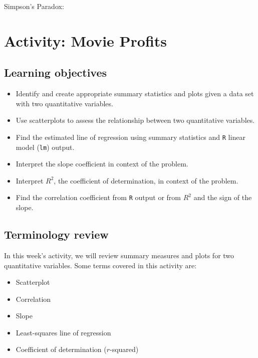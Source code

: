 \documentclass[
]{report}
\begin{document}
Simpson's Paradox:

\newpage

\hypertarget{activity-movie-profits}{%
\section{Activity: Movie Profits}\label{activity-movie-profits}}


\hypertarget{learning-objectives-1}{%
\subsection{Learning objectives}\label{learning-objectives-1}}

\begin{itemize}
\item
  Identify and create appropriate summary statistics and plots
  given a data set with two quantitative variables.
\item
  Use scatterplots to assess the relationship between two quantitative variables.
\item
  Find the estimated line of regression using summary statistics and \texttt{R} linear model (\texttt{lm}) output.
\item
  Interpret the slope coefficient in context of the problem.
\item
  Interpret \(R^2\), the coefficient of determination, in context of the problem.
\item
  Find the correlation coefficient from \texttt{R} output or from \(R^2\) and the sign of the slope.
\end{itemize}

\hypertarget{terminology-review-4}{%
\subsection{Terminology review}\label{terminology-review-4}}

In this week's activity, we will review summary measures and plots for two quantitative variables. Some terms covered in this activity are:

\begin{itemize}
\item
  Scatterplot
\item
  Correlation
\item
  Slope
\item
  Least-squares line of regression
\item
  Coefficient of determination (\(r\)-squared)
\end{itemize}
\end{document}
